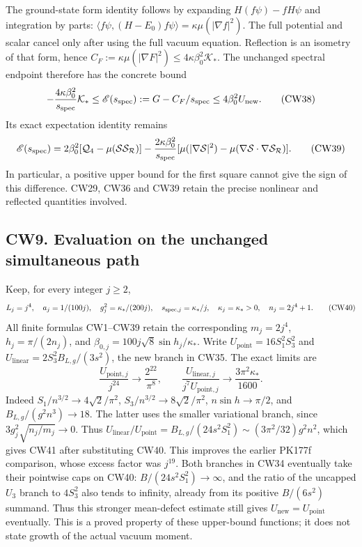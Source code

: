 \documentclass[11pt]{article}
\begin{document}
The ground-state form identity follows by expanding
\(H(f\psi)-fH\psi\) and integration by parts:
\(\langle f\psi,(H-E_0)f\psi\rangle=\kappa\mu(|\nabla f|^2)\).
The full potential and scalar cancel only after using the full
vacuum equation. Reflection is an isometry of that form, hence
\(C_F:=\kappa\mu(|\nabla F|^2)\le4\kappa\beta_0^2\mathcal K_*\).
The unchanged spectral endpoint therefore has the concrete bound
\[
 -\frac{4\kappa\beta_0^2}{s_{\rm spec}}\mathcal K_*
 \le\mathscr E(s_{\rm spec}):=G-C_F/s_{\rm spec}
 \le4\beta_0^2U_{\mathrm{new}}.                            \tag{CW38}
\]
Its exact expectation identity remains
\[
 \mathscr E(s_{\rm spec})
 =2\beta_0^2[\mathcal Q_4-\mu(\mathcal S\mathcal S_{\mathcal R})]
 -\frac{2\kappa\beta_0^2}{s_{\rm spec}}
 [\mu(|\nabla\mathcal S|^2)
      -\mu(\nabla\mathcal S\cdot\nabla\mathcal S_{\mathcal R})].
                                                               \tag{CW39}
\]
In particular, a positive upper bound for the first square cannot
give the sign of this difference. CW29, CW36 and CW39 retain
the precise nonlinear and reflected quantities involved.

\subsection*{CW9. Evaluation on the unchanged simultaneous path}

Keep, for every integer \(j\ge2\),
\[
 L_j=j^4,\quad a_j=1/(100j),\quad
 g_j^2=\kappa_*/(200j),\quad s_{{\rm spec},j}=\kappa_*/j,
 \quad\kappa_j=\kappa_*>0,\quad n_j=2j^4+1.               \tag{CW40}
\]
All finite formulas CW1–CW39 retain the corresponding
\(m_j=2j^4\), \(h_j=\pi/(2n_j)\), and
\(\beta_{0,j}=100j\sqrt8\sin h_j/\kappa_*\).
Write \(U_{\mathrm{point}}=16S_1^2S_3^2\) and
\(U_{\mathrm{linear}}=2S_3^2B_{L,g}/(3s^2)\), the new branch
in CW35. The exact limits are
\[
 \frac{U_{\mathrm{point},j}}{j^{24}}\longrightarrow\frac{2^{22}}{\pi^8},
 \qquad
 \boxed{\frac{U_{\mathrm{linear},j}}
 {j^7U_{\mathrm{point},j}}\longrightarrow
       \frac{3\pi^2\kappa_*}{1600}.}                     \tag{CW41}
\]
Indeed \(S_1/n^{3/2}\to4\sqrt2/\pi^2\),
\(S_3/n^{3/2}\to8\sqrt2/\pi^2\),
\(n\sin h\to\pi/2\), and
\(B_{L,g}/(g^2n^3)\to18\). The latter uses the smaller
variational branch, since \(3g_j^2\sqrt{n_j/m_j}\to0\).
Thus
\(U_{\mathrm{linear}}/U_{\mathrm{point}}
=B_{L,g}/(24s^2S_1^2)\sim(3\pi^2/32)g^2n^2\),
which gives CW41 after substituting CW40. This improves the
earlier PK177f comparison, whose excess factor was \(j^{19}\).
Both branches in CW34 eventually take their pointwise caps
on CW40: \(B/(24s^2S_1^2)\to\infty\), and the ratio of the
uncapped \(U_3\) branch to \(4S_3^2\) also tends to infinity,
already from its positive \(B/(6s^2)\) summand. Thus this
stronger mean-defect estimate still gives
\(U_{\mathrm{new}}=U_{\mathrm{point}}\) eventually.
This is a proved property of these upper-bound functions; it
does not state growth of the actual vacuum moment.
\end{document}
